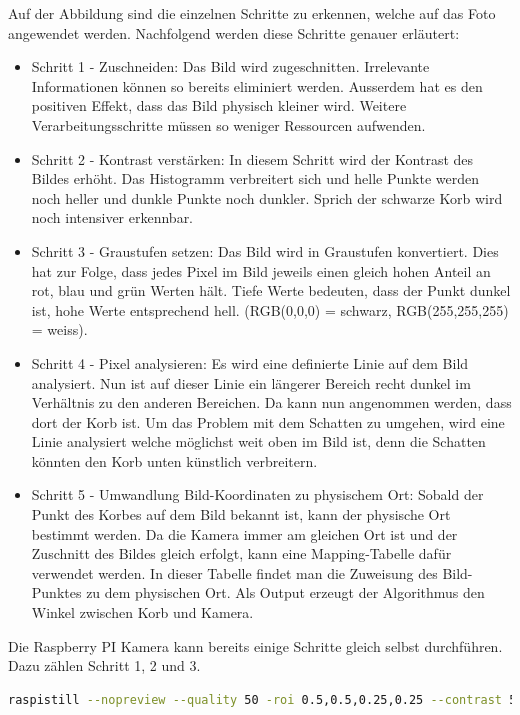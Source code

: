 Auf der Abbildung sind die einzelnen Schritte zu erkennen, welche auf das Foto angewendet werden. Nachfolgend werden diese Schritte genauer erläutert:
\begin{itemize}
	\item Schritt 1 - Zuschneiden: Das Bild wird zugeschnitten. Irrelevante Informationen können so bereits eliminiert werden. Ausserdem hat es den positiven Effekt, dass das Bild physisch kleiner wird. Weitere Verarbeitungsschritte müssen so weniger Ressourcen aufwenden. 
	
	\item Schritt 2 - Kontrast verstärken: In diesem Schritt wird der Kontrast des Bildes erhöht. Das Histogramm verbreitert sich und helle Punkte werden noch heller und dunkle Punkte noch dunkler. Sprich der schwarze Korb wird noch intensiver erkennbar. 
	
	\item Schritt 3 - Graustufen setzen: Das Bild wird in Graustufen konvertiert. Dies hat zur Folge, dass jedes Pixel im Bild jeweils einen gleich hohen Anteil an rot, blau und grün Werten hält. Tiefe Werte bedeuten, dass der Punkt dunkel ist, hohe Werte entsprechend hell. (RGB(0,0,0) = schwarz, RGB(255,255,255) = weiss).
	
	\item Schritt 4 - Pixel analysieren: Es wird eine definierte Linie auf dem Bild analysiert. Nun ist auf dieser Linie ein längerer Bereich recht dunkel im Verhältnis zu den anderen Bereichen. Da kann nun angenommen werden, dass dort der Korb ist. Um das Problem mit dem Schatten zu umgehen, wird eine Linie analysiert welche möglichst weit oben im Bild ist, denn die Schatten könnten den Korb unten künstlich verbreitern.
	
	\item Schritt 5 - Umwandlung Bild-Koordinaten zu physischem Ort: Sobald der Punkt des Korbes auf dem Bild bekannt ist, kann der physische Ort bestimmt werden. Da die Kamera immer am gleichen Ort ist und der Zuschnitt des Bildes gleich erfolgt, kann eine Mapping-Tabelle dafür verwendet werden. In dieser Tabelle findet man die Zuweisung des Bild-Punktes zu dem physischen Ort. Als Output erzeugt der Algorithmus den Winkel zwischen Korb und Kamera.
\end{itemize} 
Die Raspberry PI Kamera kann bereits einige Schritte gleich selbst durchführen. Dazu zählen Schritt 1, 2 und 3.
\begin{lstlisting}[language=bash]
raspistill --nopreview --quality 50 -roi 0.5,0.5,0.25,0.25 --contrast 50 -cfx 128:128 
\end{lstlisting}
